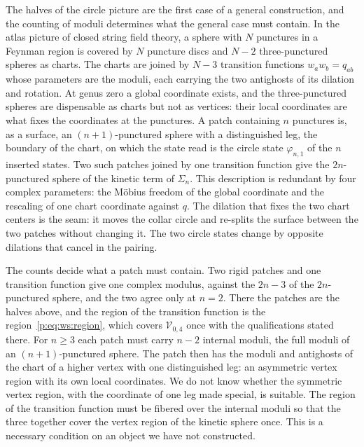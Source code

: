 The halves of the circle picture are the first case of a general construction, and the counting of moduli determines what the general case must contain.
In the atlas picture of closed string field theory, a sphere with $N$ punctures in a Feynman region is covered by $N$ puncture discs and $N - 2$ three-punctured spheres as charts.
The charts are joined by $N - 3$ transition functions $w_a w_b = q_{ab}$ whose parameters are the moduli, each carrying the two antighosts of its dilation and rotation.
At genus zero a global coordinate exists, and the three-punctured spheres are dispensable as charts but not as vertices: their local coordinates are what fixes the coordinates at the punctures.
A patch containing $n$ punctures is, as a surface, an $(n + 1)$-punctured sphere with a distinguished leg, the boundary of the chart, on which the state read is the circle state $\varphi_{n,1}$ of the $n$ inserted states.
Two such patches joined by one transition function give the $2 n$-punctured sphere of the kinetic term of $\Sigma_n$.
  This description is redundant by four complex parameters: the Möbius freedom of the global coordinate and the rescaling of one chart coordinate against $q$.
The dilation that fixes the two chart centers is the seam: it moves the collar circle and re-splits the surface between the two patches without changing it.
The two circle states change by opposite dilations that cancel in the pairing.

The counts decide what a patch must contain.
Two rigid patches and one transition function give one complex modulus, against the $2 n - 3$ of the $2 n$-punctured sphere, and the two agree only at $n = 2$.
There the patches are the halves above, and the region of the transition function is the region~\eqref{p:eq:ws:region}, which covers $\mathcal V_{0,4}$ once with the qualifications stated there.
For $n \geq 3$ each patch must carry $n - 2$ internal moduli, the full moduli of an $(n + 1)$-punctured sphere.
The patch then has the moduli and antighosts of the chart of a higher vertex with one distinguished leg: an asymmetric vertex region with its own local coordinates.
We do not know whether the symmetric vertex region, with the coordinate of one leg made special, is suitable.
The region of the transition function must be fibered over the internal moduli so that the three together cover the vertex region of the kinetic sphere once.
This is a necessary condition on an object we have not constructed.


